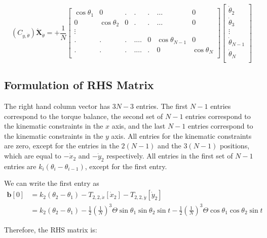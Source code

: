 \documentclass[12pt,letterpaper,titlepage]{article}
\begin{document}
\[
(C_{y,\dot{\theta}}) \mathbf{\dot{X}}_{\dot{\theta}} = + \frac{1}{N} \begin{bmatrix}
\cos\theta_1&0&.&.&.& \hdots &0\\
0&\cos\theta_2&0&.&.& \hdots &0\\
\vdots \\
.&.&.&.\hdots &0&\cos\theta_{N-1}&0\\
.&.&.&.\hdots &.&0&\cos\theta_N\\
\end{bmatrix}
\begin{bmatrix}
\dot{\theta}_2\\
\dot{\theta}_3\\
\vdots\\
\dot{\theta}_{N-1}\\
\dot{\theta}_N\\
\end{bmatrix}
\]

\newpage

\subsection{Formulation of RHS Matrix}
The right hand column vector has $3N-3$ entries. The first $N-1$ entries correspond to the torque balance, the second set of $N-1$ entries correspond to the kinematic constraints in the $x$ axis, and the last $N-1$ entries correspond to the kinematic constraints in the $y$ axis. All entries for the kinematic constraints are zero, except for the entries in the $2(N-1)$ and the $3(N-1)$ positions, which are equal to $-\dot{x}_2$ and $-\dot{y}_2$ respectively. All entries in the first set of $N-1$ entries are $k_i(\theta_i - \theta_{i-1})$, except for the first entry.

We can write the first entry as
\begin{align*}
\mathbf{b}[0] &= k_2 (\theta_2 - \theta_1) - T_{2,2,\dot{x}}[\dot{x}_2] - T_{2,2,\dot{y}}[\dot{y}_2] \\
&= k_2 (\theta_2 - \theta_1) -  \frac{1}{2}(\frac{1}{N})^3 \Theta \sin \theta_1 \sin \theta_2 \sin t - \frac{1}{2}(\frac{1}{N})^3 \Theta \cos \theta_1 \cos \theta_2 \sin t
\end{align*}

Therefore, the RHS matrix is:
\end{document}
